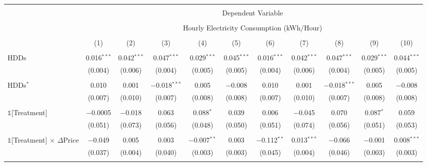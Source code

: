 
\begin{table}[!htbp] \centering 
  \label{Table:Breakdown-of-Average-Treatement-Effects_As-a-Function-of-Rate-Changes_Using-Different-Rate-Changes_Excluding-Tariff-Group-C} 
\scriptsize
\begin{longtable}{@{\extracolsep{0pt}}lcccccccccc} 
\\[-1.8ex]\hline 
\hline \\[-1.8ex] 
 & \multicolumn{10}{c}{Dependent Variable} \\ 
\cline{2-11} 
\\[-1.8ex] & \multicolumn{10}{c}{Hourly Electricity Consumption  (kWh/Hour)} \\ 
\\[-1.8ex] & (1) & (2) & (3) & (4) & (5) & (6) & (7) & (8) & (9) & (10)\\ 
\hline \\[-1.8ex] \endhead
 HDDs & 0.016$^{***}$ & 0.042$^{***}$ & 0.047$^{***}$ & 0.029$^{***}$ & 0.045$^{***}$ & 0.016$^{***}$ & 0.042$^{***}$ & 0.047$^{***}$ & 0.029$^{***}$ & 0.044$^{***}$ \\ 
  & (0.004) & (0.006) & (0.004) & (0.005) & (0.005) & (0.004) & (0.006) & (0.004) & (0.005) & (0.005) \\ 
  & & & & & & & & & & \\ 
 HDDs$^{*}$ & 0.010 & 0.001 & $-$0.018$^{***}$ & 0.005 & $-$0.008 & 0.010 & 0.001 & $-$0.018$^{***}$ & 0.005 & $-$0.008 \\ 
  & (0.007) & (0.010) & (0.007) & (0.008) & (0.008) & (0.007) & (0.010) & (0.007) & (0.008) & (0.008) \\ 
  & & & & & & & & & & \\ 
 $\mathbb{1}$[Treatment] & $-$0.0005 & $-$0.018 & 0.063 & 0.088$^{*}$ & 0.039 & 0.006 & $-$0.045 & 0.070 & 0.087$^{*}$ & 0.059 \\ 
  & (0.051) & (0.073) & (0.056) & (0.048) & (0.050) & (0.051) & (0.074) & (0.056) & (0.051) & (0.053) \\ 
  & & & & & & & & & & \\ 
 $\mathbb{1}$[Treatment] $\times$ $\Delta$Price & $-$0.049 & 0.005 & 0.003 & $-$0.007$^{**}$ & 0.003 & $-$0.112$^{**}$ & 0.013$^{***}$ & $-$0.066 & $-$0.001 & 0.008$^{***}$ \\ 
  & (0.037) & (0.004) & (0.040) & (0.003) & (0.003) & (0.045) & (0.004) & (0.046) & (0.003) & (0.003) \\ 
  & & & & & & & & & & \\ 

\end{longtable}
\end{table}
